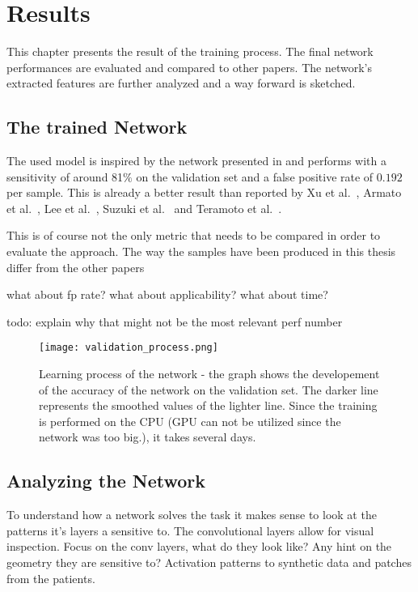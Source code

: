 \documentclass[main.tex]{subfiles}
\begin{document}
\chapter{Results}\label{chap:results}
This chapter presents the result of the training process. The final network performances are evaluated and compared to other papers. The network's extracted features are further analyzed and a way forward is sketched.

\section{The trained Network}
The used model is inspired by the network presented in \cite{huang2017lung} and performs with a sensitivity of around 81$\%$ on the validation set and a false positive rate of $0.192$ per sample. This is already a better result than reported by Xu et al.~\cite{xu1997development}, Armato et al.~\cite{armato1999computerized}, Lee et al.~\cite{lee2001automated}, Suzuki et al.~\cite{suzuki2003massive} and Teramoto et al.~\cite{teramoto2013fast}.  

This is of course not the only metric that needs to be compared in order to evaluate the approach. The way the samples have been produced in this thesis differ from the other papers

what about fp rate?
what about applicability?
what about time?


todo: explain why that might not be the most relevant perf number


\begin{figure}
\begin{center}
\texttt{[image: validation\_process.png]}
\end{center}
\caption{Learning process of the network - the graph shows the developement of the accuracy of the network on the validation set. The darker line represents the smoothed values of the lighter line. Since the training is performed on the CPU (GPU can not be utilized since the network was too big.), it takes several days.}
\label{fig:validation}
\end{figure}


\section{Analyzing the Network}
To understand how a network solves the task it makes sense to look at the patterns it's layers a sensitive to. The convolutional layers allow for visual inspection.
Focus on the conv layers, what do they look like? Any hint on the geometry they are sensitive to?
Activation patterns to synthetic data and patches from the patients.
\end{document}
